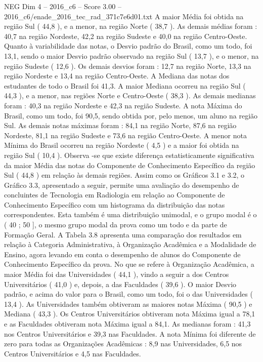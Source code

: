 \begin{textsample}{NEG Dim 4 – 2016\_c6 – Score 3.00 – 2016\_c6/enade\_2016\_tec\_rad\_371c7e6d01.txt}
A maior Média foi obtida na região Sul ( 44,8 ), e a menor, na região Norte ( 38,7 ).
As demais médias foram : 40,7 na região Nordeste, 42,2 na região Sudeste e 40,0 na região Centro-Oeste.
Quanto à variabilidade das notas, o Desvio padrão do Brasil, como um todo, foi 13,1, sendo o maior Desvio padrão observado na região Sul ( 13,7 ), e o menor, na região Sudeste ( 12,6 ).
Os demais desvios foram : 12,7 na região Norte, 13,3 na região Nordeste e 13,4 na região Centro-Oeste.
A Mediana das notas dos estudantes de todo o Brasil foi 41,3.
A maior Mediana ocorreu na região Sul ( 44,3 ), e a menor, nas regiões Norte e Centro-Oeste ( 38,3 ).
As demais medianas foram : 40,3 na região Nordeste e 42,3 na região Sudeste.
A nota Máxima do Brasil, como um todo, foi 90,5, sendo obtida por, pelo menos, um aluno na região Sul.
As demais notas máximas foram : 84,1 na região Norte, 87,6 na região Nordeste, 81,1 na região Sudeste e 73,6 na região Centro-Oeste.
A menor nota Mínima do Brasil ocorreu na região Nordeste ( 4,5 ) e a maior foi obtida na região Sul ( 10,4 ).
Observa -se que existe diferença estatisticamente significativa da maior Média das notas do Componente de Conhecimento Específico da região Sul ( 44,8 ) em relação às demais regiões.
Assim como os Gráficos 3.1 e 3.2, o Gráfico 3.3, apresentado a seguir, permite uma avaliação do desempenho de concluintes de Tecnologia em Radiologia em relação ao Componente de Conhecimento Específico com um histograma da distribuição das notas correspondentes.
Esta também é uma distribuição unimodal, e o grupo modal é o ( 40 ; 50 ], o mesmo grupo modal da prova como um todo e da parte de Formação Geral.
A Tabela 3.8 apresenta uma comparação dos resultados em relação à Categoria Administrativa, à Organização Acadêmica e a Modalidade de Ensino, agora levando em conta o desempenho de alunos do Componente de Conhecimento Específico da prova.
No que se refere à Organização Acadêmica, a maior Média foi das Universidades ( 44,1 ), vindo a seguir a dos Centros Universitários ( 41,0 ) e, depois, a das Faculdades ( 39,6 ).
O maior Desvio padrão, e acima do valor para o Brasil, como um todo, foi o das Universidades ( 13,4 ).
As Universidades também obtiveram as maiores notas Máxima ( 90,5 ) e Mediana ( 43,3 ).
Os Centros Universitários obtiveram nota Máxima igual a 78,1 e as Faculdades obtiveram nota Máxima igual a 84,1.
As medianas foram : 41,3 nos Centros Universitários e 39,3 nas Faculdades.
A nota Mínima foi diferente de zero para todas as Organizações Acadêmicas : 8,9 nas Universidades, 6,5 nos Centros Universitários e 4,5 nas Faculdades.

\end{textsample}
